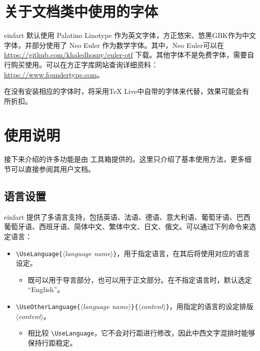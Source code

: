 \documentclass[puretext]{einfart}
\providecommand{\meta}[1]{$\langle${\normalfont\itshape#1}$\rangle$}
\providecommand{\einfart}{\textsf{einfart}}
\begin{document}
\section{关于文档类中使用的字体}
\einfart{} 默认使用 Palatino Linotype 作为英文字体，方正悠宋、悠黑GBK作为中文字体，并部分使用了 Neo Euler 作为数学字体。其中，Neo Euler可以在 \url{https://github.com/khaledhosny/euler-otf} 下载。其他字体不是免费字体，需要自行购买使用。可以在方正字库网站查询详细资料：\url{https://www.foundertype.com}。


在没有安装相应的字体时，将采用TeX Live中自带的字体来代替，效果可能会有所折扣。


\section{使用说明}

接下来介绍的许多功能是由 \ProjLib{} 工具箱提供的。这里只介绍了基本使用方法，更多细节可以直接参阅其用户文档。

\subsection{语言设置}

\einfart{} 提供了多语言支持，包括英语、法语、德语、意大利语、葡萄牙语、巴西葡萄牙语、西班牙语、简体中文、繁体中文、日文、俄文。可以通过下列命令来选定语言：
\begin{itemize}
    \item \lstinline|\UseLanguage{|\meta{language name}\lstinline|}|，用于指定语言，在其后将使用对应的语言设定。
    \begin{itemize}
        \item 既可以用于导言部分，也可以用于正文部分。在不指定语言时，默认选定 “English”。
    \end{itemize}
    \item \lstinline|\UseOtherLanguage{|\meta{language name}\lstinline|}{|\meta{content}\lstinline|}|，用指定的语言的设定排版 \meta{content}。
    \begin{itemize}
        \item 相比较 \lstinline|\UseLanguage|，它不会对行距进行修改，因此中西文字混排时能够保持行距稳定。
    \end{itemize}
\end{itemize}
\end{document}
